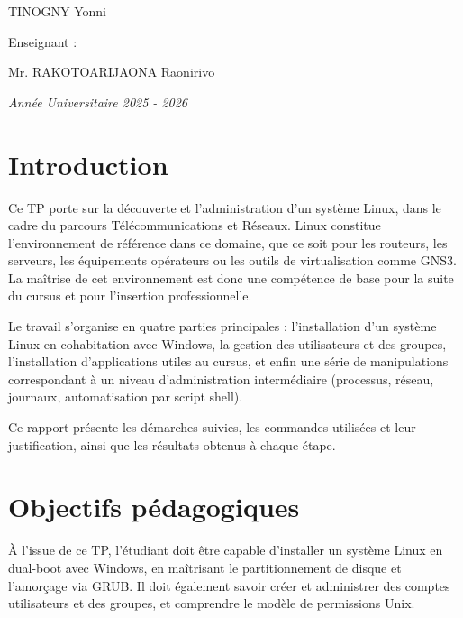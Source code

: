 \documentclass[11pt,a4paper]{article}
\begin{document}
\begin{titlepage}
\vspace{0.4cm}

{\normalsize TINOGNY Yonni}

\vspace{1.6cm}

{\small Enseignant :}

\vspace{0.4cm}

{\normalsize Mr. RAKOTOARIJAONA Raonirivo}

\vfill

{\itshape Ann\'ee Universitaire 2025 - 2026}

\vspace{0.5cm}
\end{titlepage}

\tableofcontents
\newpage

\section{Introduction}

Ce TP porte sur la d\'ecouverte et l'administration d'un syst\`eme Linux, dans le cadre du parcours
T\'el\'ecommunications et R\'eseaux. Linux constitue l'environnement de r\'ef\'erence dans ce domaine, que ce
soit pour les routeurs, les serveurs, les \'equipements op\'erateurs ou les outils de virtualisation comme GNS3.
La ma\^itrise de cet environnement est donc une comp\'etence de base pour la suite du cursus et pour
l'insertion professionnelle.

Le travail s'organise en quatre parties principales : l'installation d'un syst\`eme Linux en cohabitation
avec Windows, la gestion des utilisateurs et des groupes, l'installation d'applications utiles au cursus, et
enfin une s\'erie de manipulations correspondant \`a un niveau d'administration interm\'ediaire (processus,
r\'eseau, journaux, automatisation par script shell).

Ce rapport pr\'esente les d\'emarches suivies, les commandes utilis\'ees et leur justification, ainsi que les
r\'esultats obtenus \`a chaque \'etape.

\section{Objectifs p\'edagogiques}

\`A l'issue de ce TP, l'\'etudiant doit \^etre capable d'installer un syst\`eme Linux en dual-boot avec Windows,
en ma\^itrisant le partitionnement de disque et l'amor\c{c}age via GRUB. Il doit \'egalement savoir cr\'eer et
administrer des comptes utilisateurs et des groupes, et comprendre le mod\`ele de permissions Unix.
\end{document}
